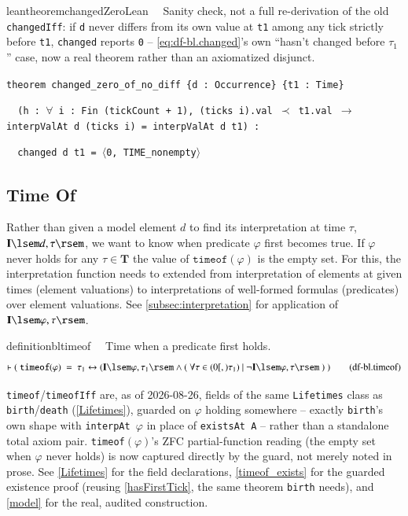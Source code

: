 \begin{restatable}{leantheorem}{changedZeroLean}~~ Sanity check, not
a full re-derivation of the old \texttt{changedIff}: if \texttt{d} never differs from its own value at
\texttt{t1} among any tick strictly before \texttt{t1}, \texttt{changed} reports \texttt{0} --
\eqref{eq:df-bl.changed}'s own ``hasn't changed before $\tau_1$'' case, now a real theorem rather than an
axiomatized disjunct.

\texttt{\textcolor{leancolor}{theorem} \textcolor{leanyellow}{changed\_zero\_of\_no\_diff} \{d : Occurrence\} \{t1 : Time\}}

\texttt{~~(h : $\forall$ i : Fin (tickCount + 1), (ticks i).val $\prec$ t1.val $\to$ interpValAt d (ticks i) = interpValAt d t1) :}

\texttt{~~changed d t1 = $\langle$0, TIME\_nonempty$\rangle$}
\label{changed_zero_of_no_diff}
\end{restatable}

\subsection{Time Of}\label{sec:timeof}

\pn Rather than given a model element $d$ to find its interpretation at time $\tau$, $\mathbf{I}\lsem d,\tau\rsem$, we want to know when predicate $\varphi$ first becomes true.  If $\varphi$ never holds for any $\tau \in \textbf{T}$ the value of $\texttt{timeof}(\varphi)$ is the empty set.
For this, the interpretation function needs to extended from interpretation of elements at given times (element valuations) to interpretations of well-formed formulas (predicates) over element valuations.  See \ref{subsec:interpretation} for application of  $\mathbf{I}\lsem \varphi,\tau\rsem$.

\begin{restatable}{definition}{bltimeof}~~ Time when a predicate first holds.
\begin{align}
\vdash (~ \texttt{timeof}(\varphi)~=~\tau_1 \leftrightarrow ( \mathbf{I}\lsem \varphi,\tau_1\rsem \wedge
 (~\forall \tau \in (0 [,) \tau_1)~\vert~\lnot \mathbf{I}\lsem \varphi,\tau\rsem ~)~)
\label{eq:df-bl.timeof}\tag{df-bl.timeof}
\end{align}
\end{restatable}

\pn \texttt{timeof}/\texttt{timeofIff} are, as of 2026-08-26, fields of the same \texttt{Lifetimes} class as
\texttt{birth}/\texttt{death} (\ref{Lifetimes}), guarded on $\varphi$ holding somewhere -- exactly
\texttt{birth}'s own shape with \texttt{interpAt $\varphi$} in place of \texttt{existsAt A} -- rather than a
standalone total axiom pair. \texttt{timeof}$(\varphi)$'s ZFC partial-function reading (the empty set when
$\varphi$ never holds) is now captured directly by the guard, not merely noted in prose. See \ref{Lifetimes}
for the field declarations, \ref{timeof_exists} for the guarded existence proof (reusing \ref{hasFirstTick},
the same theorem \texttt{birth} needs), and \ref{model} for the real, audited construction.

